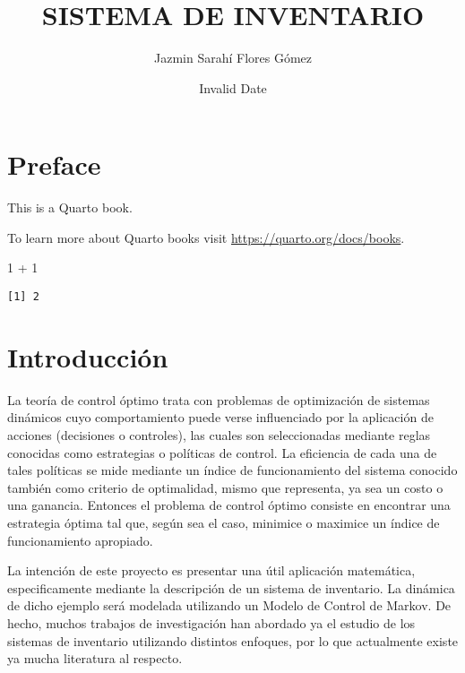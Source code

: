 \documentclass[
  letterpaper,
  DIV=11,
  numbers=noendperiod]{scrreprt}
\title{SISTEMA DE INVENTARIO}
\author{Jazmin Sarahí Flores Gómez}
\date{Invalid Date}
\newenvironment{Shaded}{\begin{snugshade}}{\end{snugshade}}
\newcommand{\DecValTok}[1]{\textcolor[rgb]{0.68,0.00,0.00}{#1}}
\newcommand{\SpecialCharTok}[1]{\textcolor[rgb]{0.37,0.37,0.37}{#1}}
\renewcommand*\contentsname{Table of contents}
\newcommand\contentsname{Table of contents}
\begin{document}
\maketitle

\renewcommand*\contentsname{Table of contents}
{
\hypersetup{linkcolor=}
\setcounter{tocdepth}{2}
\tableofcontents
}


\chapter*{Preface}\label{preface}


This is a Quarto book.

To learn more about Quarto books visit
\url{https://quarto.org/docs/books}.

\begin{Shaded}
\begin{Highlighting}[]
\DecValTok{1} \SpecialCharTok{+} \DecValTok{1}
\end{Highlighting}
\end{Shaded}

\begin{verbatim}
[1] 2
\end{verbatim}


\chapter{Introducción}\label{introducciuxf3n}

La teoría de control óptimo trata con problemas de optimización de
sistemas dinámicos cuyo comportamiento puede verse influenciado por la
aplicación de acciones (decisiones o controles), las cuales son
seleccionadas mediante reglas conocidas como estrategias o políticas de
control. La eficiencia de cada una de tales políticas se mide mediante
un índice de funcionamiento del sistema conocido también como criterio
de optimalidad, mismo que representa, ya sea un costo o una ganancia.
Entonces el problema de control óptimo consiste en encontrar una
estrategia óptima tal que, según sea el caso, minimice o maximice un
índice de funcionamiento apropiado.

La intención de este proyecto es presentar una útil aplicación
matemática, especificamente mediante la descripción de un sistema de
inventario. La dinámica de dicho ejemplo será modelada utilizando un
Modelo de Control de Markov. De hecho, muchos trabajos de investigación
han abordado ya el estudio de los sistemas de inventario utilizando
distintos enfoques, por lo que actualmente existe ya mucha literatura al
respecto.
\end{document}
